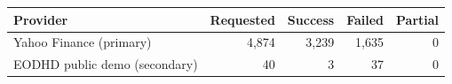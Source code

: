 \begin{tabular}{@{}lrrrr@{}}
\toprule
Provider & Requested & Success & Failed & Partial \\
\midrule
Yahoo Finance (primary) & 4,874 & 3,239 & 1,635 & 0 \\
EODHD public demo (secondary) & 40 & 3 & 37 & 0 \\
\bottomrule
\end{tabular}
